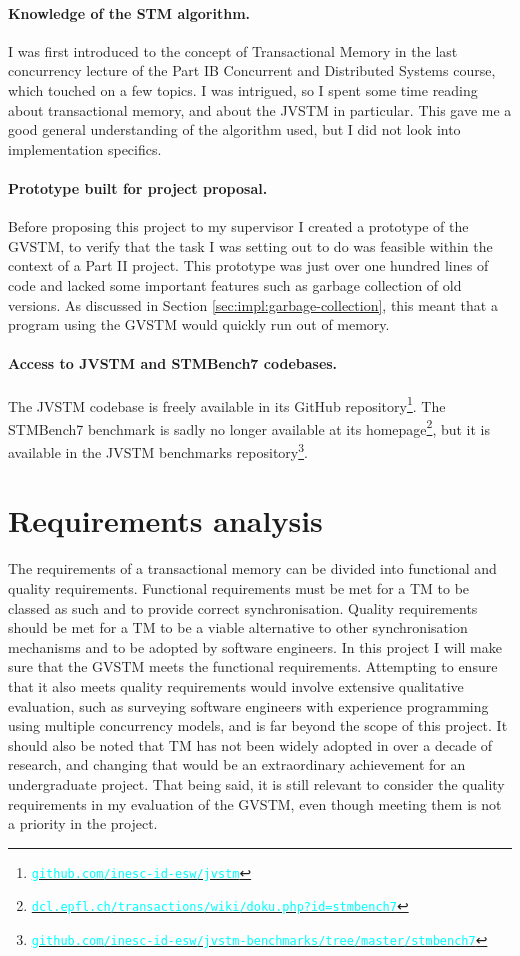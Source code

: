 \documentclass[12pt,a4paper,oneside,openright]{report}
\newcommand{\URL}[1]{\href{https://#1}{\textcolor{cyan}{\texttt{#1}}}}
\begin{document}
\paragraph{Knowledge of the STM algorithm.} I was first introduced to
the concept of Transactional Memory in the last concurrency lecture of
the Part IB Concurrent and Distributed Systems course, which touched
on a few topics. I was intrigued, so I spent some time reading about
transactional memory, and about the JVSTM in particular. This gave me
a good general understanding of the algorithm used, but I did not look
into implementation specifics.

\paragraph{Prototype built for project proposal.} Before proposing
this project to my supervisor I created a prototype of the GVSTM, to
verify that the task I was setting out to do was feasible within the
context of a Part II project. This prototype was just over one hundred
lines of code and lacked some important features such as garbage
collection of old versions. As discussed in Section
\ref{sec:impl:garbage-collection}, this meant that a program using the
GVSTM would quickly run out of memory.

\paragraph{Access to JVSTM and STMBench7 codebases.} The JVSTM
codebase is freely available in its GitHub
repository\footnote{\URL{github.com/inesc-id-esw/jvstm}}. The
STMBench7 benchmark is sadly no longer available at its
homepage\footnote{\URL{dcl.epfl.ch/transactions/wiki/doku.php?id=stmbench7}},
but it is available in the JVSTM benchmarks
repository\footnote{\URL{github.com/inesc-id-esw/jvstm-benchmarks/tree/master/stmbench7}}.

\section{Requirements analysis}
\label{sec:requ-analys}

The requirements of a transactional memory can be divided into
functional and quality requirements. Functional requirements must be
met for a TM to be classed as such and to provide correct
synchronisation. Quality requirements should be met for a TM to be a
viable alternative to other synchronisation mechanisms and to be
adopted by software engineers. In this project I will make sure that
the GVSTM meets the functional requirements. Attempting to ensure that
it also meets quality requirements would involve extensive qualitative
evaluation, such as surveying software engineers with experience
programming using multiple concurrency models, and is far beyond the
scope of this project. It should also be noted that TM has not been
widely adopted in over a decade of research, and changing that would
be an extraordinary achievement for an undergraduate project. That
being said, it is still relevant to consider the quality requirements
in my evaluation of the GVSTM, even though meeting them is not a
priority in the project.
\end{document}
